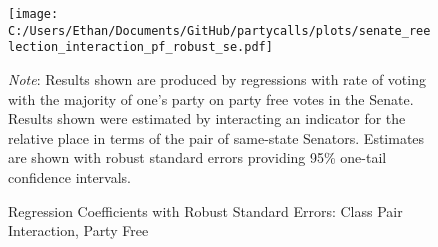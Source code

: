 \documentclass[12pt]{article}
\newcommand\fnote[1]{\captionsetup{font=small}\caption*{#1}}
\begin{document}
\begin{figure}[H]
	\centering
	\caption{Regression Coefficients with Robust Standard Errors: Class Pair Interaction, Party Free}
	\texttt{[image: C:/Users/Ethan/Documents/GitHub/partycalls/plots/senate\_reelection\_interaction\_pf\_robust\_se.pdf]}
	\fnote{\textit{Note}: Results shown are produced by regressions with rate of voting with the majority of one's party on party free votes in the Senate. Results shown were estimated by interacting an indicator for the relative place in terms of the pair of same-state Senators. Estimates are shown with robust standard errors providing 95\% one-tail confidence intervals.}
\end{figure}
\end{document}
